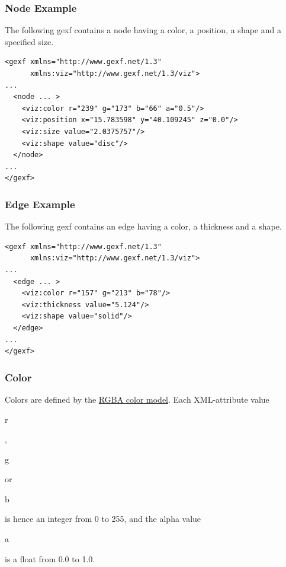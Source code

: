 \documentclass[a4paper,10pt]{article}
\begin{document}
\subsubsection{Node Example}

The following gexf contains a node having a color, a position, a shape and a specified size.

\lstset{ style=gexf }
\begin{lstlisting}[caption={VIZ Attributes},label=vizattr]
<gexf xmlns="http://www.gexf.net/1.3"
      xmlns:viz="http://www.gexf.net/1.3/viz">
...
  <node ... >
    <viz:color r="239" g="173" b="66" a="0.5"/>
    <viz:position x="15.783598" y="40.109245" z="0.0"/>
    <viz:size value="2.0375757"/>
    <viz:shape value="disc"/>
  </node>
...
</gexf>
\end{lstlisting}

\subsubsection{Edge Example}

The following gexf contains an edge having a color, a thickness and a shape.

\lstset{ style=gexf }
\begin{lstlisting}[caption={VIZ Attributes},label=vizattr]
<gexf xmlns="http://www.gexf.net/1.3"
      xmlns:viz="http://www.gexf.net/1.3/viz">
...
  <edge ... >
    <viz:color r="157" g="213" b="78"/>
    <viz:thickness value="5.124"/>
    <viz:shape value="solid"/>
  </edge>
...
</gexf>
\end{lstlisting}

\subsubsection{Color}

Colors are defined by the \href{http://en.wikipedia.org/wiki/RGBA}{RGBA color model}. Each XML-attribute value \begin{footnotesize}r\end{footnotesize}, \begin{footnotesize}g\end{footnotesize} or \begin{footnotesize}b\end{footnotesize} is hence an integer from 0 to 255, and the alpha value \begin{footnotesize}a\end{footnotesize} is a float from 0.0 to 1.0.
\end{document}
